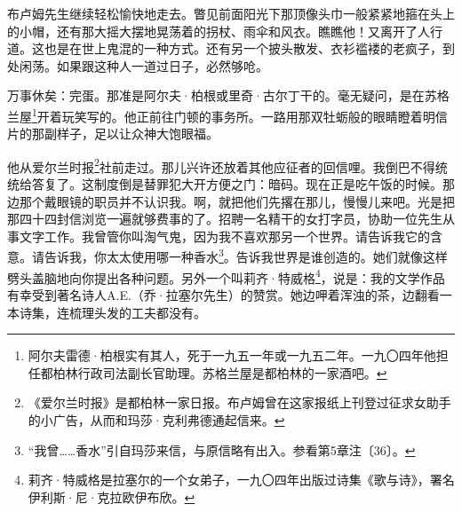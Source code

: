\par 布卢姆先生继续轻松愉快地走去。瞥见前面阳光下那顶像头巾一般紧紧地箍在头上的小帽，还有那大摇大摆地晃荡着的拐杖、雨伞和风衣。瞧瞧他！又离开了人行道。这也是在世上鬼混的一种方式。还有另一个披头散发、衣衫褴褛的老疯子，到处闲荡。如果跟这种人一道过日子，必然够呛。
\par 万事休矣：完蛋。那准是阿尔夫·柏根或里奇·古尔丁干的。毫无疑问，是在苏格兰屋\footnote{阿尔夫雷德·柏根实有其人，死于一九五一年或一九五二年。一九〇四年他担任都柏林行政司法副长官助理。苏格兰屋是都柏林的一家酒吧。}开着玩笑写的。他正前往门顿的事务所。一路用那双牡蛎般的眼睛瞪着明信片的那副样子，足以让众神大饱眼福。
\par 他从爱尔兰时报\footnote{《爱尔兰时报》是都柏林一家日报。布卢姆曾在这家报纸上刊登过征求女助手的小广告，从而和玛莎·克利弗德通起信来。}社前走过。那儿兴许还放着其他应征者的回信哩。我倒巴不得统统给答复了。这制度倒是替罪犯大开方便之门：暗码。现在正是吃午饭的时候。那边那个戴眼镜的职员并不认识我。啊，就把他们先撂在那儿，慢慢儿来吧。光是把那四十四封信浏览一遍就够费事的了。招聘一名精干的女打字员，协助一位先生从事文字工作。我曾管你叫淘气鬼，因为我不喜欢那另一个世界。请告诉我它的含意。请告诉我，你太太使用哪一种香水\footnote{“我曾……香水”引自玛莎来信，与原信略有出入。参看第5章注〔36〕。}。告诉我世界是谁创造的。她们就像这样劈头盖脑地向你提出各种问题。另外一个叫莉齐·特威格\footnote{莉齐·特威格是拉塞尔的一个女弟子，一九〇四年出版过诗集《歌与诗》，署名伊利斯·尼·克拉欧伊布欣。}，说是：我的文学作品有幸受到著名诗人A.E.（乔·拉塞尔先生）的赞赏。她边呷着浑浊的茶，边翻看一本诗集，连梳理头发的工夫都没有。
